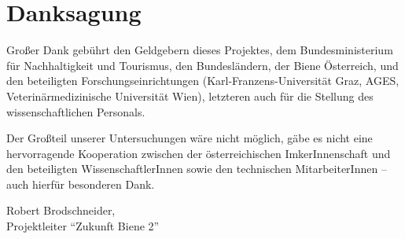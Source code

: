 {}
\section*{Danksagung}

Großer Dank gebührt den Geldgebern dieses Projektes, dem Bundesministerium für Nachhaltigkeit und Tourismus, den Bundesländern, der Biene Österreich, und den beteiligten Forschungseinrichtungen (Karl-Franzens-Universität Graz, AGES, Veterinärmedizinische Universität Wien), letzteren auch für die Stellung des wissenschaftlichen Personals.

Der Großteil unserer Untersuchungen wäre nicht möglich, gäbe es nicht eine hervorragende Kooperation zwischen der österreichischen ImkerInnenschaft und den beteiligten WissenschaftlerInnen sowie den technischen MitarbeiterInnen – auch hierfür besonderen Dank.

\begin{flushright}
    Robert Brodschneider, \\
    Projektleiter \enquote{Zukunft Biene 2}
\end{flushright}